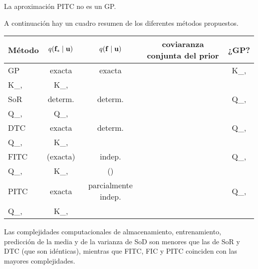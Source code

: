 \begin{proposition}
	La aproximación PITC no es un GP.
\end{proposition}

A continuación hay un cuadro resumen de los diferentes métodos propuestos.
\begin{table}[h]
	\centering
	\begin{tabular}{lcccc}
		\hline
		Método	& \(q(\mathbf{f}_{\ast} \mid \mathbf{u})\)	& \(q(\mathbf{f} \mid \mathbf{u})\)	& coviaranza conjunta del prior	& ¿GP?\\
		\hline
		GP		& exacta						& exacta				& \(\begin{bmatrix} K_{\bff, \bff} & K_{\bff, \ast}\\ K_{\ast, \bff} & K_{\ast, \ast} \end{bmatrix}\)	& \checkmark\\
		SoR		& determ.						& determ.				& \(\begin{bmatrix} Q_{\bff, \bff} & Q_{\bff, \ast}\\ Q_{\ast, \bff} & Q_{\ast, \ast} \end{bmatrix}\)	& \checkmark\\
		DTC		& exacta						& determ.				& \(\begin{bmatrix} Q_{\bff, \bff} & Q_{\bff, \ast}\\ Q_{\ast, \bff} & K_{\ast, \ast} \end{bmatrix}\)	& \\
		FITC	& (exacta)						& indep.				& \(\begin{bmatrix} Q_{\bff, \bff}-\diag[Q_{\bff, \bff}-K_{\bff, \bff}] & Q_{\bff, \ast}\\ Q_{\ast, \bff} & K_{\ast, \ast} \end{bmatrix}\)	& (\checkmark)\\
		PITC	& exacta						& parcialmente indep.	& \(\begin{bmatrix} Q_{\bff, \bff}-\blockdiag[Q_{\bff, \bff}-K_{\bff, \bff}] & Q_{\bff, \ast}\\ Q_{\ast, \bff} & K_{\ast, \ast} \end{bmatrix}\)	& \\
	\end{tabular}
\end{table}


\begin{proposition}
	Las complejidades computacionales de almacenamiento, entrenamiento, predicción de la media y de la varianza de SoD son menores que las de SoR y DTC (que son idénticas), mientras que FITC, FIC y PITC coinciden con las mayores complejidades.
\end{proposition}

